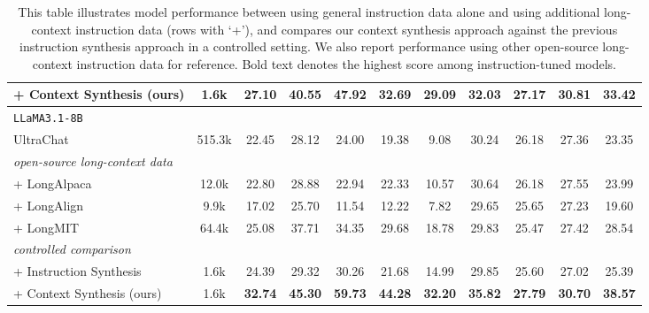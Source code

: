 \begin{table*}[ht]
{\begin{tabular}{p{4cm}cccccccccc}
+ Context Synthesis (ours)                & 1.6k       & \textbf{27.10} & \textbf{40.55} & \textbf{47.92} & \textbf{32.69} & \textbf{29.09}  & \textbf{32.03} & \textbf{27.17} & \textbf{30.81} & \textbf{33.42}       \\
\hline
\texttt{\hspace{1cm}LLaMA3.1-8B}     &            &                &                &                &                 &                &                &                &                &                      \\
UltraChat~\cite{ding2023enhancing}        & 515.3k     & 22.45          & 28.12          & 24.00          & 19.38           & 9.08           & 30.24          & 26.18          & 27.36          & 23.35                \\
\hdashline
\textit{open-source long-context data}    &            &                &                &                &                 &                &                &                &                &                      \\
+ LongAlpaca~\cite{chen2024longlora}      & 12.0k      & 22.80          & 28.88          & 22.94          & 22.33           & 10.57          & 30.64          & 26.18          & 27.55          & 23.99                \\
+ LongAlign~\cite{bai2024longalign}       & 9.9k       & 17.02          & 25.70          & 11.54          & 12.22           & 7.82           & 29.65          & 25.65          & 27.23          & 19.60                \\
+ LongMIT~\cite{chen2024essential}        & 64.4k      & 25.08          & 37.71          & 34.35          & 29.68           & 18.78          & 29.83          & 25.47          & 27.42          & 28.54                \\
\hdashline
\textit{controlled comparison}            &            &                &                &                &                 &                &                &                &                &                      \\
+ Instruction Synthesis~\cite{bai2024longalign} & 1.6k & 24.39          & 29.32          & 30.26          & 21.68           & 14.99          & 29.85          & 25.60          & 27.02          & 25.39                \\
+ Context Synthesis (ours)                & 1.6k       & \textbf{32.74} & \textbf{45.30} & \textbf{59.73} & \textbf{44.28}  & \textbf{32.20} & \textbf{35.82} & \textbf{27.79} & \textbf{30.70} & \textbf{38.57}       \\
\hline
\end{tabular}
}
\caption{This table illustrates model performance between using general instruction data alone and using additional long-context instruction data (rows with `+'), and compares our context synthesis approach against the previous instruction synthesis approach in a controlled setting. We also report performance using other open-source long-context instruction data for reference. Bold text denotes the highest score among instruction-tuned models.}
\label{tab:compare}
\end{table*}
\endgroup

